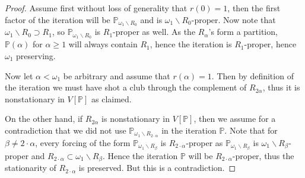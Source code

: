 \documentclass[a4paper,12pt]{article}
\newcommand{\forceP}{\mathbb{P}}
\begin{document}
\begin{proof}
Assume first without loss of generality that $r(0)=1$, then the first factor of the iteration will be $\forceP_{\omega_1 \backslash R_0}$ and is $\omega_1 \backslash R_0$-proper. Now note that $\omega_1 \backslash R_0 \supset R_1$, so $\forceP_{\omega_1 \backslash R_0} $  is $R_1$-proper as well. As the $R_{\alpha}$'s form a partition, $\forceP({\alpha})$ for $\alpha \ge 1$ will always contain $R_1$, hence the iteration is $R_1$-proper, hence $\omega_1$ preserving. 

Now let $\alpha < \omega_1$ be arbitrary and assume that $r(\alpha)=1$. Then by definition of the iteration
 we must have shot a club through the complement of $R_{2 \alpha}$, thus it is nonstationary in $V[{\forceP}]$ as claimed. 
 
On the other hand, if $R_{2 \alpha}$ is nonstationary in $V[{\forceP}]$, then we assume for a contradiction that we did not use $\forceP_{\omega_1 \backslash R_{ 2 \cdot \alpha}}$ in the iteration $\forceP$.
Note that for $\beta \ne 2 \cdot \alpha$, every forcing of the form $\forceP_{\omega_1 \backslash R_{\beta}}$ is $R_{2 \cdot \alpha}$-proper as $\forceP_{\omega_1 \backslash R_{\beta}}$ is $\omega_1 \backslash R_{\beta}$-proper and $R_{2\cdot \alpha} \subset \omega_1 \backslash R_{\beta}$.
 Hence the iteration $\forceP$ will  be $R_{2 \cdot \alpha}$-proper, thus the stationarity of $R_{2 \cdot \alpha}$ is preserved. But this is a contradiction.

 \end{proof}
\end{document}

